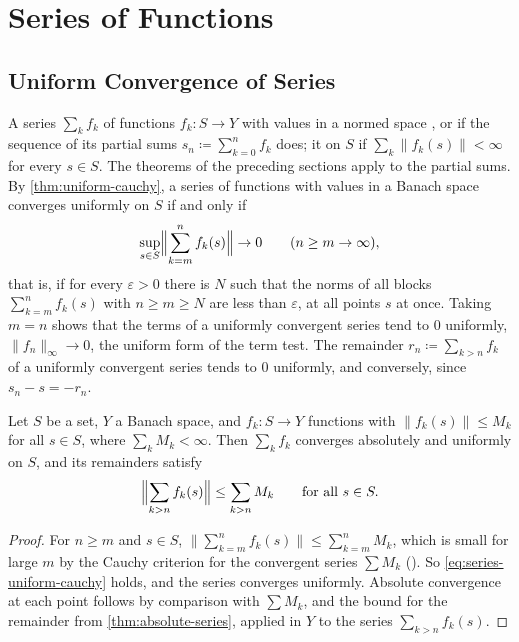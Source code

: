 \section{Series of Functions}
\label{sec:function-series}

\subsection{Uniform Convergence of Series}

A series $\sum_kf_k$ of functions $f_k\colon S\to Y$ with values in a normed space ,  or  if the sequence of its partial sums $s_n\coloneqq\sum_{k=0}^nf_k$ does; it  on $S$ if $\sum_k\|f_k(s)\|<\infty$ for every $s\in S$. The theorems of the preceding sections apply to the partial sums. By \cref{thm:uniform-cauchy}, a series of functions with values in a Banach space converges uniformly on $S$ if and only if
\begin{equation}
\sup_{s\in S}\Bigl\|\sum_{k=m}^nf_k(s)\Bigr\|\to0\qquad(n\ge m\to\infty),
\label{eq:series-uniform-cauchy}
\end{equation}
that is, if for every $\varepsilon>0$ there is $N$ such that the norms of all blocks $\sum_{k=m}^nf_k(s)$ with $n\ge m\ge N$ are less than $\varepsilon$, at all points $s$ at once. Taking $m=n$ shows that the terms of a uniformly convergent series tend to $0$ uniformly, $\|f_n\|_\infty\to0$, the uniform form of the term test. The remainder $r_n\coloneqq\sum_{k>n}f_k$ of a uniformly convergent series tends to $0$ uniformly, and conversely, since $s_n-s=-r_n$.

\begin{theorem}
\label{thm:m-test}
Let $S$ be a set, $Y$ a Banach space, and $f_k\colon S\to Y$ functions with $\|f_k(s)\|\le M_k$ for all $s\in S$, where $\sum_kM_k<\infty$. Then $\sum_kf_k$ converges absolutely and uniformly on $S$, and its remainders satisfy
\[
\Bigl\|\sum_{k>n}f_k(s)\Bigr\|\le\sum_{k>n}M_k\qquad\text{for all }s\in S .
\]
\end{theorem}

\begin{proof}
For $n\ge m$ and $s\in S$, $\|\sum_{k=m}^nf_k(s)\|\le\sum_{k=m}^nM_k$, which is small for large $m$ by the Cauchy criterion for the convergent series $\sum M_k$ (). So \eqref{eq:series-uniform-cauchy} holds, and the series converges uniformly. Absolute convergence at each point follows by comparison with $\sum M_k$, and the bound for the remainder from \cref{thm:absolute-series}, applied in $Y$ to the series $\sum_{k>n}f_k(s)$.
\end{proof}

